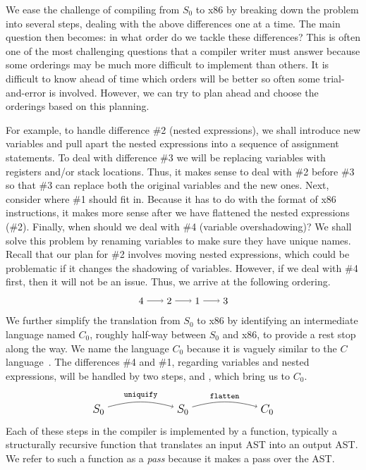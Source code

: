 \documentclass[12pt]{book}
\begin{document}
We ease the challenge of compiling from $S_0$ to x86 by breaking down
the problem into several steps, dealing with the above differences one
at a time. The main question then becomes: in what order do we tackle
these differences? This is often one of the most challenging questions
that a compiler writer must answer because some orderings may be much
more difficult to implement than others. It is difficult to know ahead
of time which orders will be better so often some trial-and-error is
involved. However, we can try to plan ahead and choose the orderings
based on this planning.

For example, to handle difference \#2 (nested expressions), we shall
introduce new variables and pull apart the nested expressions into a
sequence of assignment statements.  To deal with difference \#3 we
will be replacing variables with registers and/or stack
locations. Thus, it makes sense to deal with \#2 before \#3 so that
\#3 can replace both the original variables and the new ones. Next,
consider where \#1 should fit in. Because it has to do with the format
of x86 instructions, it makes more sense after we have flattened the
nested expressions (\#2). Finally, when should we deal with \#4
(variable overshadowing)?  We shall solve this problem by renaming
variables to make sure they have unique names. Recall that our plan
for \#2 involves moving nested expressions, which could be problematic
if it changes the shadowing of variables. However, if we deal with \#4
first, then it will not be an issue.  Thus, we arrive at the following
ordering.
\[
\begin{tikzpicture}[baseline=(current  bounding  box.center)]
\foreach \i/\p in {4/1,2/2,1/3,3/4}
{ 
  \node (\i) at (\p,0) {$\i$};
}
\foreach \x/\y in {4/2,2/1,1/3}
{
  \draw[->] (\x) to (\y);
}
\end{tikzpicture}
\]
We further simplify the translation from $S_0$ to x86 by identifying
an intermediate language named $C_0$, roughly half-way between $S_0$
and x86, to provide a rest stop along the way. We name the language
$C_0$ because it is vaguely similar to the $C$
language~\citep{Kernighan:1988nx}. The differences \#4 and \#1,
regarding variables and nested expressions, will be handled by two
steps,  and , which bring us to
$C_0$.
\[
\begin{tikzpicture}[baseline=(current  bounding  box.center)]
\foreach \i/\p in {S_0/1,S_0/2,C_0/3}
{ 
  \node (\p) at (\p*3,0) {\large $\i$};
}
\foreach \x/\y/\lbl in {1/2/uniquify,2/3/flatten}
{
 \path[->,bend left=15] (\x) edge [above] node {\ttfamily\footnotesize \lbl} (\y);
}
\end{tikzpicture}
\]
Each of these steps in the compiler is implemented by a function,
typically a structurally recursive function that translates an input
AST into an output AST. We refer to such a function as a \emph{pass}
because it makes a pass over the AST.
\end{document}

